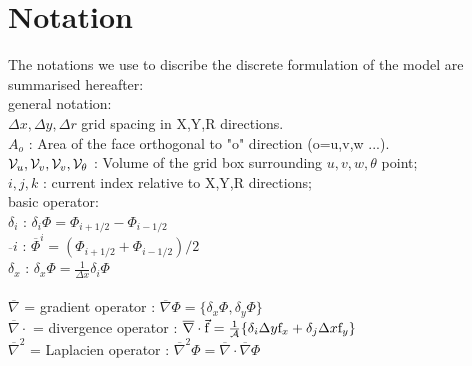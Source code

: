 
\section{Notation} 

The notations we use to discribe the discrete formulation 
of the model are summarised hereafter:\\
general notation:
\\ $\Delta x, \Delta y, \Delta r$ grid spacing in X,Y,R directions.
\\ $A_o$ : Area of the face orthogonal to "o" direction (o=u,v,w ...).
\\ ${\cal V}_u , {\cal V}_v , {\cal V}_v , {\cal V}_\theta$ :
Volume of the grid box surrounding $u,v,w,\theta$ point;
\\ $i,j,k$ : current index relative to X,Y,R directions;
\\basic operator:
\\ $\delta_i $ : $\delta_i \Phi = \Phi_{i+1/2} - \Phi_{i-1/2} $
\\ $\overline{~}i$ : $\overline{\Phi}^i = ( \Phi_{i+1/2} + \Phi_{i-1/2} ) / 2 $ 
\\ $\delta_x $ : $\delta_x \Phi = \frac{1}{\Delta x} \delta_i \Phi $
\\
\\ $\overline{\nabla}$ = gradient operator :  
$\overline{\nabla} \Phi = \{ \delta_x \Phi , \delta_y \Phi \}$
\\ $\overline{\nabla} \cdot$ = divergence operator :  
$\overline{\nabla}\cdot \vec{\mathrm{f}}  = 
\frac{1}{\cal A} \{ \delta_i \Delta y \mathrm{f}_x 
                  + \delta_j \Delta x \mathrm{f}_y \} $
\\ $\overline{\nabla}^2 $ = Laplacien operator :
$ \overline{\nabla}^2 \Phi = 
   \overline{\nabla}\cdot \overline{\nabla}\Phi $
